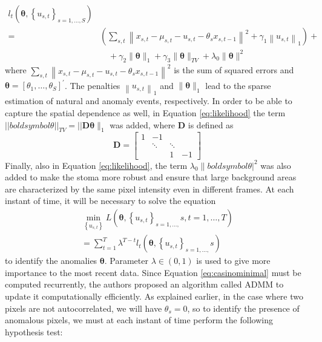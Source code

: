 \begin{equation}
\label{eq:likelihood}
\begin{aligned}
l_t\left(\boldsymbol{\theta},\left\{u_{s, t}\right\}_{s=1, \ldots, S}\right) & \\
= & \left(\sum_{s, t}\left\|x_{s, t}-\mu_{s, t}-u_{s, t}-\theta_s x_{s, t-1}\right\|^2+\gamma_1\left\|u_{s, t}\right\|_1\right)+ \\
& \quad+\gamma_2\|\boldsymbol{\theta}\|_1+\gamma_3\|\boldsymbol{\theta}\|_{T V}+\lambda_0\|\boldsymbol{\theta}\|^2
\end{aligned}
\end{equation}
where $\sum_{s, t}\left\|x_{s, t}-\mu_{s, t}-u_{s, t}-\theta_s x_{s, t-1}\right\|^2$ is the sum of squared errors and $\bm{\theta}=\left[\theta_1, \ldots, \theta_S\right]^{\prime}$. The penalties $\left\|u_{s, t}\right\|_1$ and $\|\boldsymbol{\theta}\|_1$ lead to the sparse estimation of natural and anomaly events, respectively. In order to be able to capture the spatial dependence as well, in Equation \ref{eq:likelihood} the term $||boldsymbol{\theta}||_{T V}=||\boldsymbol{D} \boldsymbol{\theta}\|_1$ was added, where $\boldsymbol{D}$ is defined as
\begin{equation*}
    \boldsymbol{D}=\left[\begin{array}{cccc}
1 & -1 & & \\
& \ddots & \ddots & \\
& & 1 & -1
\end{array}\right]
\end{equation*}
Finally, also in Equation \ref{eq:likelihood}, the term $\lambda_0\|boldsymbol{\theta}|^2$ was also added to make the stoma more robust and ensure that large background areas are characterized by the same pixel intensity even in different frames. At each instant of time, it will be necessary to solve the equation
\begin{equation}
\label{eq:casinominimal}
\begin{gathered}
\min _{\left\{u_{s, t}\right\}} L\left(\boldsymbol{\theta},\left\{u_{s, t}\right\}_{s=1, \ldots,} s, t=1, \ldots, T\right) \\
=\sum_{t=1}^T \lambda^{T-t} l_t\left(\boldsymbol{\theta},\left\{u_{s, t}\right\}_{s=1, \ldots,} s\right)
\end{gathered}
\end{equation}
to identify the anomalies $\bm{\theta}$. Parameter $\lambda \in (0,1)$ is used to give more importance to the most recent data. Since Equation \ref{eq:casinominimal} must be computed recurrently, the authors proposed an algorithm called ADMM to update it computationally efficiently. As explained earlier, in the case where two pixels are not autocorrelated, we will have $\theta_s=0$, so to identify the presence of anomalous pixels, we must at each instant of time perform the following hypothesis test:
